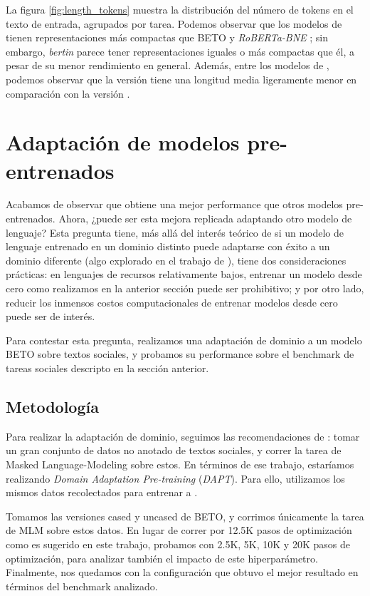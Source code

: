 La figura \ref{fig:length_tokens} muestra la distribución del número de tokens en el texto de entrada, agrupados por tarea. Podemos observar que los modelos de \robertuito{} tienen representaciones más compactas que BETO  y \emph {RoBERTa-BNE} ; sin embargo, \emph{bertin} parece tener representaciones iguales o más compactas que él, a pesar de su menor rendimiento en general. Además, entre los modelos de \robertuito{}, podemos observar que la versión \deacc{} tiene una longitud media ligeramente menor en comparación con la versión \uncased{}.


\section{Adaptación de modelos pre-entrenados}
\label{sec:domain_adaptation_vs_robertuito}

Acabamos de observar que \robertuito{} obtiene una mejor performance que otros modelos pre-entrenados. Ahora, ¿puede ser esta mejora replicada adaptando otro modelo de lenguaje? Esta pregunta tiene, más allá del interés teórico de si un modelo de lenguaje entrenado en un dominio distinto puede adaptarse con éxito a un dominio diferente (algo explorado en el trabajo de \citet{gururangan-etal-2020-dont}), tiene dos consideraciones prácticas: en lenguajes de recursos relativamente bajos, entrenar un modelo desde cero como realizamos en la anterior sección puede ser prohibitivo; y por otro lado, reducir los inmensos costos computacionales de entrenar modelos desde cero puede ser de interés.

Para contestar esta pregunta, realizamos una adaptación de dominio a un modelo BETO sobre textos sociales, y probamos su performance sobre el benchmark de tareas sociales descripto en la sección anterior.


\subsection{Metodología}

Para realizar la adaptación de dominio, seguimos las recomendaciones de \citet{gururangan-etal-2020-dont}: tomar un gran conjunto de datos no anotado de textos sociales, y correr la tarea de Masked Language-Modeling sobre estos. En términos de ese trabajo, estaríamos realizando \emph{Domain Adaptation Pre-training} (\emph{DAPT}). Para ello, utilizamos los mismos datos recolectados para entrenar a \robertuito{}.

Tomamos las versiones cased y uncased de BETO, y corrimos únicamente la tarea de MLM sobre estos datos. En lugar de correr por 12.5K pasos de optimización como es sugerido en este trabajo, probamos con 2.5K, 5K, 10K y 20K pasos de optimización, para analizar también el impacto de este hiperparámetro. Finalmente, nos quedamos con la configuración que obtuvo el mejor resultado en términos del benchmark analizado.

